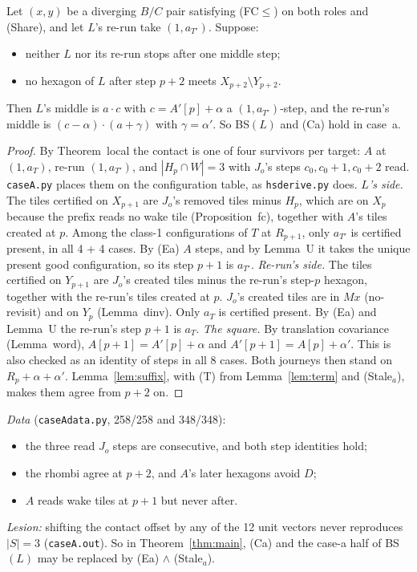 \documentclass[11pt]{article}
\theoremstyle{definition}\newtheorem{definition}[theorem]{Definition}\newtheorem{remark}[theorem]{Remark}
\begin{document}
\begin{proposition}\label{prop:casea}
Let $(x,y)$ be a diverging $B/C$ pair satisfying \textup{(FC$\le$)} on both roles and \textup{(Share)}, and let $L$'s re-run take $(1,a_{T'})$. Suppose:
\begin{itemize}
\item[\textbf{(Ea)}] neither $L$ nor its re-run stops after one middle step;
\item[\textbf{(Stale$_a$)}] no hexagon of $L$ after step $p+2$ meets $X_{p+2}\setminus Y_{p+2}$.
\end{itemize}
Then $L$'s middle is $a\cdot c$ with $c=A'[p]+\alpha$ a $(1,a_{T'})$-step, and the re-run's middle is $(c-\alpha)\cdot(a+\gamma)$ with $\gamma=\alpha'$. So BS$(L)$ and (Ca) hold in case~a.
\end{proposition}
\begin{proof}
By Theorem~local the contact is one of four survivors per target: $A$ at $(1,a_T)$, re-run $(1,a_{T'})$, and $|H_p\cap W|=3$ with $J_o$'s steps $c_0,c_0+1,c_0+2$ read. \texttt{caseA.py} places them on the configuration table, as \texttt{hsderive.py} does.
\emph{$L$'s side.} The tiles certified on $X_{p+1}$ are $J_o$'s removed tiles minus $H_p$, which are on $X_p$ because the prefix reads no wake tile (Proposition~fc), together with $A$'s tiles created at $p$. Among the class-1 configurations of $T$ at $R_{p+1}$, only $a_{T'}$ is certified present, in all 4 + 4 cases. By (Ea) $A$ steps, and by Lemma~U it takes the unique present good configuration, so its step $p+1$ is $a_{T'}$.
\emph{Re-run's side.} The tiles certified on $Y_{p+1}$ are $J_o$'s created tiles minus the re-run's step-$p$ hexagon, together with the re-run's tiles created at $p$. $J_o$'s created tiles are in $Mx$ (no-revisit) and on $Y_p$ (Lemma~dinv). Only $a_T$ is certified present. By (Ea) and Lemma~U the re-run's step $p+1$ is $a_T$.
\emph{The square.} By translation covariance (Lemma~word), $A[p+1]=A'[p]+\alpha$ and $A'[p+1]=A[p]+\alpha'$. This is also checked as an identity of steps in all 8 cases. Both journeys then stand on $R_p+\alpha+\alpha'$. Lemma~\ref{lem:suffix}, with (T) from Lemma~\ref{lem:term} and (Stale$_a$), makes them agree from $p+2$ on.
\end{proof}
\noindent\emph{Data} (\texttt{caseAdata.py}, 258/258 and 348/348):
\begin{itemize}
\item the three read $J_o$ steps are consecutive, and both step identities hold;
\item the rhombi agree at $p+2$, and $A$'s later hexagons avoid $D$;
\item $A$ reads wake tiles at $p+1$ but never after.
\end{itemize}
\emph{Lesion:} shifting the contact offset by any of the 12 unit vectors never reproduces $|S|=3$ (\texttt{caseA.out}).
So in Theorem~\ref{thm:main}, (Ca) and the case-a half of BS$(L)$ may be replaced by (Ea) $\wedge$ (Stale$_a$).
\end{document}
